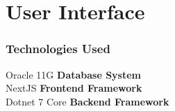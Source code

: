 \chapter{User Interface}
\hrulefill

\subsection*{Technologies Used}


Oracle 11G \dotfill \textbf{Database System}\\
NextJS \dotfill \textbf{Frontend Framework}\\
Dotnet 7 Core \dotfill \textbf{Backend Framework}\\



\hrulefill



